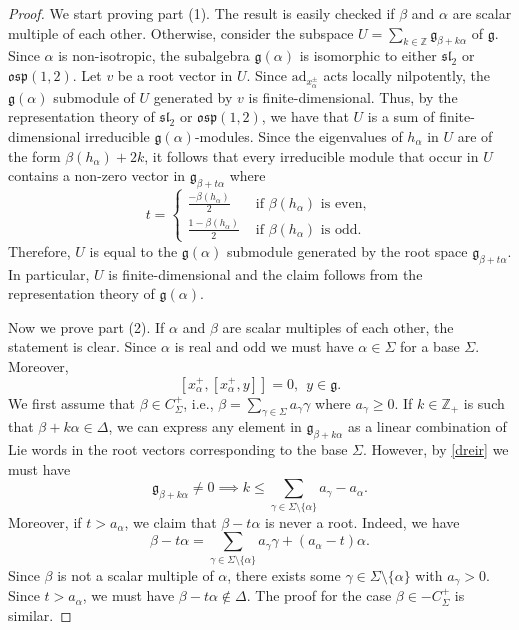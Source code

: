 \documentclass[10pt,a4paper]{amsart}
\newcommand{\lie}[1]{\mathfrak{#1}}
\begin{document}
\begin{proof}
 We start proving part (1). The result is easily checked if $\beta$ and $\alpha$ are scalar multiple of each other. Otherwise, consider the subspace $U=\sum_{k\in \mathbb{Z}} \lie g_{\beta+k\alpha}$ of $\lie g.$ Since $\alpha$ is non-isotropic, the subalgebra $\lie g(\alpha)$ 
    is isomorphic to either $\lie{sl}_2$ or $\lie{osp}(1,2).$ Let $v$ be a root vector in $U.$ Since $\mathrm{ad}_{x_\alpha^\pm}$ acts locally nilpotently, the $\lie g{(\alpha)}$ submodule of $U$ generated by $v$ is finite-dimensional. Thus, by the representation theory of $\lie{sl}_2$ or $\lie{osp}(1,2)$, we have that $U$ is a sum of finite-dimensional irreducible $\lie g{(\alpha)}$-modules. 
    Since the eigenvalues of $h_\alpha$ in $U$ are of the form $\beta(h_\alpha)+2k$, it follows that every irreducible module that occur in $U$ contains a non-zero vector in $\lie g_{\beta+t\alpha}$ where $$t=\begin{cases}
        \frac{-\beta(h_\alpha)}{2}& \text{ if } \beta(h_\alpha) \text{ is even},\\
        \frac{1-\beta(h_\alpha)}{2}& \text{ if } \beta(h_\alpha) \text{ is odd}.
    \end{cases}$$
    Therefore, $U$ is equal to the $\lie g{(\alpha)}$ submodule generated by the root space $\lie g_{\beta+t\alpha}$. In particular, $U$ is finite-dimensional and the claim follows from the representation theory of $\lie g(\alpha).$
    
  Now we prove part (2). If $\alpha$ and $\beta$ are scalar multiples of each other, the statement is clear. Since $\alpha$ is real and odd we must have $\alpha\in\Sigma$ for a base $\Sigma$. Moreover, 
\begin{equation}\label{dreir}[x^+_{\alpha},[x_{\alpha}^+,y]]=0,\ \ y\in \lie g.\end{equation} We first assume that $\beta\in C^+_\Sigma$, i.e., $\beta=\sum_{\gamma\in \Sigma}a_{\gamma}\gamma$ where $a_{\gamma}\geq 0$. If $k\in \mathbb{Z}_+$ is such that $\beta+k\alpha\in \Delta$, we can express any element in $\mathfrak{g}_{\beta+k\alpha}$ as a linear combination of Lie words in the root vectors corresponding to the base $\Sigma$. However, by \eqref{dreir} we must have 
$$\mathfrak{g}_{\beta+k\alpha}\neq 0 \implies k\leq \sum_{\gamma\in \Sigma\setminus\{\alpha\}}a_\gamma-a_\alpha.$$
Moreover, if $t > a_\alpha$, we claim that $\beta - t\alpha$ is never a root. Indeed, we have
$$\beta - t\alpha = \sum_{\gamma \in \Sigma \setminus \{\alpha\}} a_{\gamma} \gamma + (a_\alpha - t)\alpha.$$
Since $\beta$ is not a scalar multiple of $\alpha$, there exists some $\gamma \in \Sigma \setminus \{\alpha\}$ with $a_{\gamma} > 0$. Since $t > a_\alpha$, we must have $\beta - t\alpha\notin \Delta$. The proof  for the case $\beta\in -C^+_\Sigma$ is similar.
\end{proof}
\end{document}
